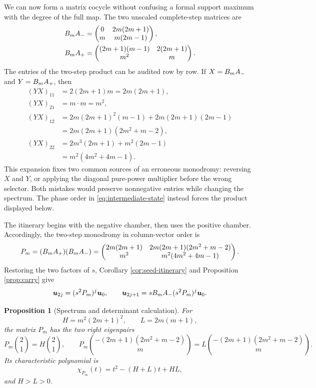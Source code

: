 \documentclass[11pt]{article}
\newtheorem{proposition}[theorem]{Proposition}
\theoremstyle{definition}
\theoremstyle{remark}
\begin{document}
We can now form a matrix cocycle without confusing a formal support maximum
with the degree of the full map.  The two unscaled complete-step matrices are
\begin{align}
B_mA_{-}
&=\begin{pmatrix}
0&2m(2m+1)\\
m&m(2m-1)
\end{pmatrix},
\label{eq:bm-am}\\
B_mA_{+}
&=\begin{pmatrix}
(2m+1)(m-1)&2(2m+1)\\
m^2&m
\end{pmatrix}.
\label{eq:bm-ap}
\end{align}
The entries of the two-step product can be audited row by row.  If
\(X=B_mA_{-}\) and \(Y=B_mA_{+}\), then
\begin{align*}
(YX)_{11}&=2(2m+1)m=2m(2m+1),\\
(YX)_{21}&=m\cdot m=m^2,\\
(YX)_{12}
&=2m(2m+1)^2(m-1)+2m(2m+1)(2m-1)\\
&=2m(2m+1)(2m^2+m-2),\\
(YX)_{22}
&=2m^3(2m+1)+m^2(2m-1)\\
&=m^2(4m^2+4m-1).
\end{align*}
This expansion fixes two common sources of an erroneous monodromy: reversing
\(X\) and \(Y\), or applying the diagonal pure-power multiplier before the
wrong selector.  Both mistakes would preserve nonnegative entries while
changing the spectrum.  The phase order in
\eqref{eq:intermediate-state} instead forces the product displayed below.

The itinerary begins with the negative chamber, then uses the positive
chamber.  Accordingly, the two-step monodromy in column-vector order is
\begin{equation}
P_m=(B_mA_{+})(B_mA_{-})
=\begin{pmatrix}
2m(2m+1)&2m(2m+1)(2m^2+m-2)\\
m^2&m^2(4m^2+4m-1)
\end{pmatrix}.
\label{eq:monodromy}
\end{equation}
Restoring the two factors of \(s\), Corollary
\ref{cor:seed-itinerary} and Proposition \ref{prop:carry} give
\begin{equation}
\boldsymbol{u}_{2j}=(s^2P_m)^j\boldsymbol{u}_0,\qquad
\boldsymbol{u}_{2j+1}=sB_mA_{-}(s^2P_m)^j\boldsymbol{u}_0.
\label{eq:vector-laws}
\end{equation}

\begin{proposition}[Spectrum and determinant calculation]
\label{prop:spectrum}
For
\[
H=m^2(2m+1)^2,\qquad L=2m(m+1),
\]
the matrix \(P_m\) has the two right eigenpairs
\begin{equation}
P_m\binom{2}{1}=H\binom{2}{1},
\qquad
P_m\binom{-(2m+1)(2m^2+m-2)}{m}
=L\binom{-(2m+1)(2m^2+m-2)}{m}.
\label{eq:eigenpairs}
\end{equation}
Its characteristic polynomial is
\[
\chi_{P_m}(t)=t^2-(H+L)t+HL,
\]
and \(H>L>0\).
\end{proposition}
\end{document}
